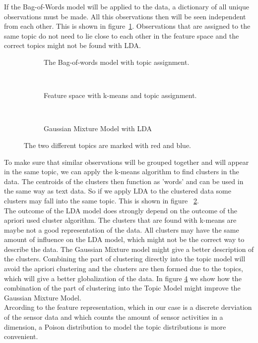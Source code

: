 \documentclass[11pt,a4paper]{article}
\begin{document}
If the Bag-of-Words model will be applied to the data, a dictionary of all unique observations must be made. All this observations then will be seen independent from each other. This is shown in figure~\ref{fig:FSBOW}. Observations that are assigned to the same topic do not need to lie close to each other in the feature space and the correct topics might not be found with LDA.

\begin{figure}[h!]
\centering
\begin{subfigure}[b]{0.3\linewidth}
\centering
\def\svgwidth{140pt}

\caption{The Bag-of-words model with topic assignment.}
\label{fig:FSBOW}
\end{subfigure}
~
\begin{subfigure}[b]{0.3\linewidth}
\centering
\def\svgwidth{140pt}

\caption{Feature space with k-means and topic assignment.}
\label{fig:FSk-means}
\end{subfigure}
~
\begin{subfigure}[b]{0.3\textwidth}
\centering
\def\svgwidth{140pt}

\caption{Gaussian Mixture Model with LDA}
\label{fig:GMM+LDA}
\end{subfigure}
\caption{The two different topics are marked with red and blue.}
\end{figure}

To make sure that similar observations will be grouped together and will appear in the same topic, we can apply the k-means algorithm to find clusters in the data. The centroids of the clusters then function as 'words' and can be used in the same way as text data. So if we apply LDA to the clustered data some clusters may fall into the same topic. This is shown in figure ~\ref{fig:FSk-means}.\\
The outcome of the LDA model does strongly depend on the outcome of the apriori used cluster algorithm. The clusters that are found with k-means are maybe not a good representation of the data. All clusters may have the same amount of influence on the LDA model, which might not be the correct way to describe the data. The Gaussian Mixture model might give a better description of the clusters. Combining the part of clustering directly into the topic model will avoid the apriori clustering and the clusters are then formed due to the topics, which will give a better globalization of the data. In figure \ref{fig:GMM+LDA} we show how the combination of the part of clustering into the Topic Model might improve the Gaussian Mixture Model.\\
Arcording to the feature representation, which in our case is a discrete derviation of the sensor data and which counts the amount of sensor activities in a dimension, a Poison distribution to model the topic distributions is more convenient.
\end{document}
